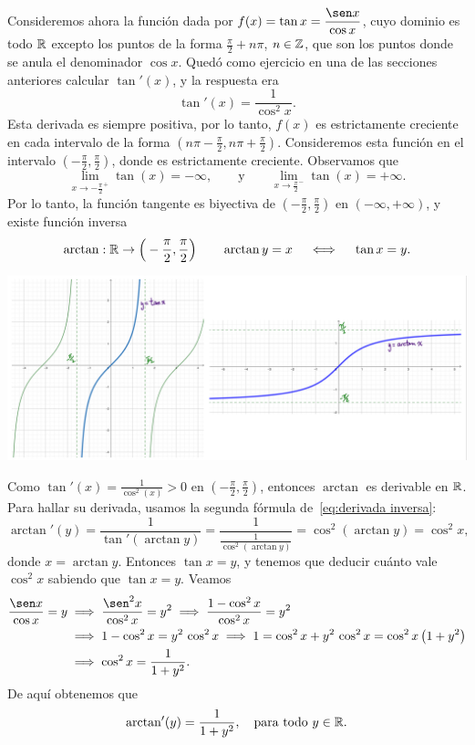 \begin{example}
    Consideremos ahora la función dada por $\D f(x)=\tan x=\frac{\sen x}{\cos x}$, cuyo dominio es todo $\mathbb{R}$ excepto los puntos de la forma $\frac\pi2+n\pi$, $n\in\mathbb{Z}$, que son los puntos donde se anula el denominador $\cos x$.
    Quedó como ejercicio en una de las secciones anteriores calcular $\tan'(x)$, y la respuesta era
    \[
    \tan'(x)=\frac1{\cos^2x}.
    \]
    Esta derivada es siempre positiva, por lo tanto, $f(x)$ es estrictamente creciente en cada intervalo de la forma $(n\pi-\frac\pi2,n\pi+\frac\pi2)$. Consideremos esta función en el intervalo $(-\frac\pi2,\frac\pi2)$, donde es estrictamente creciente. Observamos que
    \[
    \lim_{x\to-\frac\pi2^+}\tan(x)=-\infty,
    \qquad\text{y}\qquad
    \lim_{x\to\frac\pi2^-}\tan(x)=+\infty.
    \]
    Por lo tanto, la función tangente es biyectiva de $(-\frac\pi2,\frac\pi2)$ en $(-\infty,+\infty)$, y existe función inversa 
    \[
    \arctan: \mathbb{R} \to \Big(-\frac\pi2,\frac\pi2\Big)
    \qquad
    \arctan y = x \quad\iff\quad \tan x = y.
    \]

    \centerline{\includegraphics[width=.8\textwidth]{pics/tan-atan.jpeg}}
    
 Como $\tan'(x)=\frac1{\cos^2(x)}> 0$ en $(-\frac\pi2,\frac\pi2)$, entonces $\arctan$ es derivable en $\mathbb{R}$.
    Para hallar su derivada, usamos la segunda fórmula de~\eqref{eq:derivada inversa}:
    \[
    \arctan'(y) = \frac{1}{\tan'(\arctan y)}
    = \frac1{\frac1{\cos^2(\arctan y)}} 
    = \cos^2(\arctan y)
    = \cos^2 x,
    \]
    donde $x=\arctan y$. Entonces $\tan x=y$, y tenemos que deducir cuánto vale $\cos^2 x$ sabiendo que $\tan x = y$. 
    Veamos
    \begin{align*}
        \frac{\sen x}{\cos x} = y
        &\implies
        \frac{\sen^2 x}{\cos^2 x} = y^2
        \implies 
        \frac{1-\cos^2 x}{\cos^2 x} = y^2
        \\
        &\implies
        1-\cos^2 x = y^2 \, \cos^2x
        \implies 
        1 = \cos^2 x + y^2 \, \cos^2x
        = \cos^2 x \, \big(1+y^2\big)
        \\
        &\implies \cos^2x = \frac1{1+y^2}.
    \end{align*}
    De aquí obtenemos que
    \[
    \arctan'(y) =  \frac1{1+y^2},
    \quad\text{para todo $y\in\mathbb{R}$.}
    \]
\end{example}


